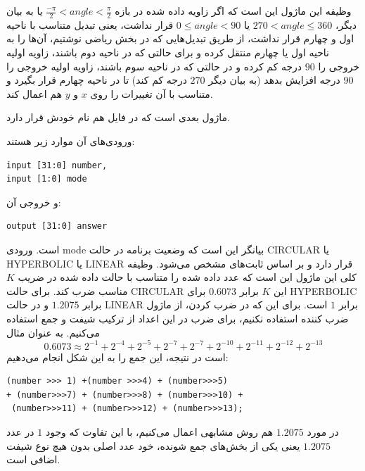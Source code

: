 \documentclass[12pt,titlepage,a4page , tikz , multi,table , svgnames,xcdraw]{article}
\begin{document}
وظیفه این ماژول این است که اگر زاویه داده شده در بازه
 $\frac{-\pi}{2} < angle < \frac{\pi}{2}$
 یا به بیان دیگر،
 $270 < angle \leq 360$
 یا
 $0 \leq angle <90$
 قرار نداشت،
یعنی تبدیل متناسب با ناحیه اول و چهارم قرار نداشت، از طریق تبدیل‌هایی که در بخش ریاضی نوشتیم، آن‌ها را به ناحیه اول یا چهارم منتقل کرده و برای حالتی که در ناحیه دوم باشند، زاویه اولیه خروجی را $90$ درجه کم کرده و در حالتی که در ناحیه سوم باشند، زاویه اولیه خروجی را $90$ درجه افزایش بدهد (به بیان دیگر $270$ درجه کم کند) تا در ناحیه چهارم قرار بگیرد و متناسب با آن تغییرات را روی $x$ و $y$ هم اعمال کند.


\hrulefill

ماژول بعدی  است که در فایل هم نام خودش قرار دارد.

 
 ورودی‌های آن موارد زیر هستند:

\begin{latin}
\begin{verbatim}
input [31:0] number,
input [1:0] mode
\end{verbatim}
\end{latin}

و خروجی آن:

\begin{latin}
\begin{verbatim}
output [31:0] answer
\end{verbatim}
\end{latin}

است. ورودی mode بیانگر این است که وضعیت برنامه در حالت CIRCULAR یا HYPERBOLIC یا LINEAR قرار دارد و بر اساس ثابت‌های  مشخص می‌شود. وظیفه کلی این ماژول این است که عدد داده شده را متناسب با حالت داده شده در ضریب $K$ مناسب ضرب کند. برای حالت CIRCULAR این $K$ برابر $0.6073$ برای HYPERBOLIC برابر $1.2075$ و در حالت LINEAR برابر $1$ است. برای این که در ضرب کردن، از ماژول ضرب کننده استفاده نکنیم، برای ضرب در این اعداد از ترکیب شیفت و جمع استفاده می‌کنیم. به عنوان مثال
$$0.6073 \approx 2^{-1} + 2^{-4} + 2^{-5} + 2^{-7} + 2^{-7} + 2^{-10} + 2^{-11} + 2^{-12} + 2^{-13}$$
است در نتیجه، این جمع را به این شکل انجام می‌دهیم:

\begin{latin}
\begin{verbatim}
(number >>> 1) +(number >>>4) + (number>>>5)
+ (number>>>7) + (number>>>8) + (number>>>10) +
 (number>>>11) + (number>>>12) + (number>>>13);
\end{verbatim}
\end{latin}

در مورد $1.2075$ هم روش مشابهی اعمال می‌کنیم، با این تفاوت که وجود $1$ در عدد $1.2075$ یعنی یکی از بخش‌های جمع شونده، خود عدد اصلی بدون هیچ نوع شیفت اضافی است.
\end{document}
